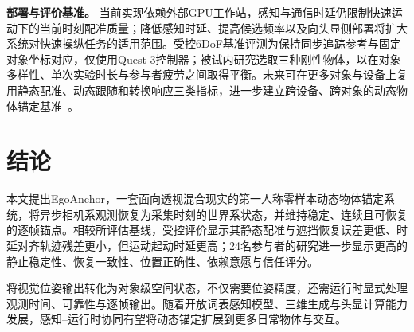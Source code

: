 \documentclass[review]{vgtc}
\begin{document}
\textbf{部署与评价基准。}
当前实现依赖外部GPU工作站，感知与通信时延仍限制快速运动下的当前时刻配准质量；降低感知时延、提高候选频率以及向头显侧部署将扩大系统对快速操纵任务的适用范围。受控6DoF基准评测为保持同步追踪参考与固定对象坐标对应，仅使用Quest 3控制器；被试内研究选取三种刚性物体，以在对象多样性、单次实验时长与参与者疲劳之间取得平衡。未来可在更多对象与设备上复用静态配准、动态跟随和转换响应三类指标，进一步建立跨设备、跨对象的动态物体锚定基准~\cite{cheng2024tracking,hu2024applemeta,hu2025xrrealitycheck}。

\section{结论}\label{sec:conclusion}

本文提出EgoAnchor，一套面向透视混合现实的第一人称零样本动态物体锚定系统，将异步相机系观测恢复为采集时刻的世界系状态，并维持稳定、连续且可恢复的逐帧锚点。相较所评估基线，受控评价显示其静态配准与遮挡恢复误差更低、时延对齐轨迹残差更小，但运动起动时延更高；24名参与者的研究进一步显示更高的静止稳定性、恢复一致性、位置正确性、依赖意愿与信任评分。

将视觉位姿输出转化为对象级空间状态，不仅需要位姿精度，还需运行时显式处理观测时间、可靠性与逐帧输出。随着开放词表感知模型、三维生成与头显计算能力发展，感知--运行时协同有望将动态锚定扩展到更多日常物体与交互。




\end{document}
